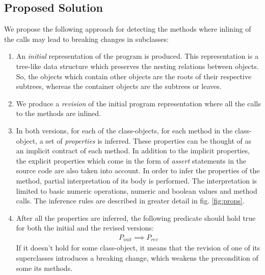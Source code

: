\subsection{Proposed Solution}
\label{impl:unjustified_algo}
We propose the following approach for detecting the methods where inlining of the calls may lead to breaking changes in subclasses:
\begin{enumerate}
    \item An \textit{initial} representation of the program is produced. This representation is a tree-like data structure which preserves the nesting relations between objects. So, the objects which contain other objects are the roots of their respective subtrees, whereas the container objects are the subtrees or leaves.
    \item We produce a \textit{revision} of the initial program representation where all the calls to the methods are inlined.
    \item In both versions, for each of the class-objects, for each method in the class-object, a set of \textit{properties} is inferred.  These properties can be thought of as an implicit contract \cite{meyer} of each method. In addition to the implicit properties, the explicit properties which come in the form of \textit{assert} statements in the source code are also taken into account. In order to infer the properties of the method, partial interpretation of its body is performed. The interpretation is limited to basic numeric operations, numeric and boolean values and method calls. The inference rules are described in greater detail in fig. \ref{fig:props}.
    \item After all the properties are inferred, the following predicate should hold true for both the initial and the revised versions:
          \begin{align}
              P_{init} \implies P_{rev}
              \label{fig:implication}
          \end{align}
          If it doesn't hold for some class-object, it means that the revision of one of its superclasses introduces a breaking change, which weakens the precondition of some its methods.
\end{enumerate}

